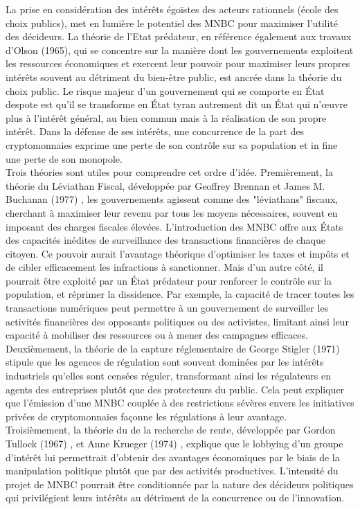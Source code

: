 \documentclass[12pt]{article}
\begin{document}
La prise en considération des intérêts égoïstes des acteurs rationnels (école des choix publics), met en lumière le potentiel des MNBC pour maximiser l'utilité des décideurs. La théorie de l'Etat prédateur, en référence également aux travaux d'Olson (1965), qui se concentre sur la manière dont les gouvernements exploitent les ressources économiques et exercent leur pouvoir pour maximiser leurs propres intérêts souvent au détriment du bien-être public, est ancrée dans la théorie du choix public. Le risque majeur d'un gouvernement qui se comporte en État despote est qu'il se transforme en État tyran autrement dit un État qui n’œuvre plus à l’intérêt général, au bien commun mais à la réalisation de son propre intérêt. Dans la défense de ses intérêts, une concurrence de la part des cryptomonnaies exprime une perte de son contrôle sur sa population et in fine une perte de son monopole. \\

Trois théories sont utiles pour comprendre cet ordre d'idée. Premièrement, la théorie du Léviathan Fiscal, développée par Geoffrey Brennan et James M. Buchanan (1977) \cite{brennan_towards_1977}, les gouvernements agissent comme des "léviathans" fiscaux, cherchant à maximiser leur revenu par tous les moyens nécessaires, souvent en imposant des charges fiscales élevées. L'introduction des MNBC offre aux États des capacités inédites de surveillance des transactions financières de chaque citoyen. Ce pouvoir aurait l'avantage théorique d'optimiser les taxes et impôts et de cibler efficacement les infractions à sanctionner. Mais d'un autre côté, il pourrait être exploité par un État prédateur pour renforcer le contrôle sur la population,  et réprimer la dissidence. Par exemple, la capacité de tracer toutes les transactions numériques peut permettre à un gouvernement de surveiller les activités financières des opposants politiques ou des activistes, limitant ainsi leur capacité à mobiliser des ressources ou à mener des campagnes efficaces. Deuxièmement, la théorie de la capture réglementaire de George Stigler (1971) \cite{35b326a5-1ea5-3ed0-86c0-90e4a4a0356c} stipule que les agences de régulation sont souvent dominées par les intérêts industriels qu'elles sont censées réguler, transformant ainsi les régulateurs en agents des entreprises plutôt que des protecteurs du public. Cela peut expliquer que l'émission d'une MNBC couplée à des restrictions sévères envers les initiatives privées de cryptomonnaies façonne les régulations à leur avantage. Troisièmement, la théorie du de la recherche de rente, développée par Gordon Tullock (1967) \cite{RePEc:elg:eechap:381_2}, et Anne Krueger (1974) \cite{RePEc:aea:aecrev:v:64:y:1974:i:3:p:291-303}, explique que le lobbying d'un groupe d'intérêt lui permettrait d'obtenir des avantages économiques par le biais de la manipulation politique plutôt que par des activités productives. L'intensité du projet de MNBC pourrait être conditionnée par la nature des décideurs politiques qui privilégient leurs intérêts au détriment de la concurrence ou de l'innovation.
\end{document}
